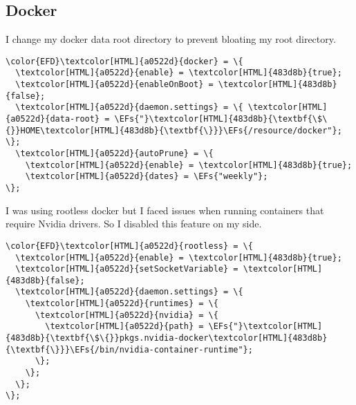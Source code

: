 \documentclass[14pt]{article}
\newcommand{\EFs}[1]{\textcolor{EFs}{#1}} %
\begin{document}
\subsection{Docker}
\label{sec:org01ebd22}
I change my docker data root directory to prevent bloating my root directory.
\begin{Code}
\begin{Verbatim}
\color{EFD}\textcolor[HTML]{a0522d}{docker} = \{
  \textcolor[HTML]{a0522d}{enable} = \textcolor[HTML]{483d8b}{true};
  \textcolor[HTML]{a0522d}{enableOnBoot} = \textcolor[HTML]{483d8b}{false};
  \textcolor[HTML]{a0522d}{daemon.settings} = \{ \textcolor[HTML]{a0522d}{data-root} = \EFs{"}\textcolor[HTML]{483d8b}{\textbf{\$\{}}HOME\textcolor[HTML]{483d8b}{\textbf{\}}}\EFs{/resource/docker"}; \};
  \textcolor[HTML]{a0522d}{autoPrune} = \{
    \textcolor[HTML]{a0522d}{enable} = \textcolor[HTML]{483d8b}{true};
    \textcolor[HTML]{a0522d}{dates} = \EFs{"weekly"};
\};
\end{Verbatim}
\end{Code}

I was using rootless docker but I faced issues when running containers that require Nvidia drivers. So I disabled this feature on my side.
\begin{Code}
\begin{Verbatim}
\color{EFD}\textcolor[HTML]{a0522d}{rootless} = \{
  \textcolor[HTML]{a0522d}{enable} = \textcolor[HTML]{483d8b}{true};
  \textcolor[HTML]{a0522d}{setSocketVariable} = \textcolor[HTML]{483d8b}{false};
  \textcolor[HTML]{a0522d}{daemon.settings} = \{
    \textcolor[HTML]{a0522d}{runtimes} = \{
      \textcolor[HTML]{a0522d}{nvidia} = \{
        \textcolor[HTML]{a0522d}{path} = \EFs{"}\textcolor[HTML]{483d8b}{\textbf{\$\{}}pkgs.nvidia-docker\textcolor[HTML]{483d8b}{\textbf{\}}}\EFs{/bin/nvidia-container-runtime"};
      \};
    \};
  \};
\};
\end{Verbatim}
\end{Code}
\end{document}
